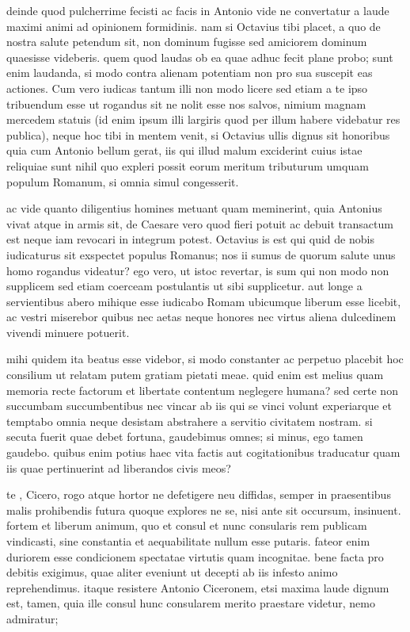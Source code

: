  deinde quod pulcherrime fecisti ac facis in Antonio vide ne convertatur a laude maximi animi ad opinionem formidinis. nam si Octavius tibi placet, a quo de nostra salute petendum sit, non dominum fugisse sed amiciorem dominum quaesisse videberis. quem quod laudas ob ea quae adhuc fecit plane probo; sunt enim laudanda, si modo contra alienam potentiam non pro sua suscepit eas actiones. Cum vero iudicas tantum illi non modo licere sed etiam a te ipso tribuendum esse ut rogandus sit ne nolit esse nos salvos, nimium magnam mercedem statuis (id enim ipsum illi largiris quod per illum habere videbatur res publica), neque hoc tibi in mentem venit, si Octavius ullis dignus sit honoribus quia cum Antonio bellum gerat, iis qui illud malum exciderint cuius istae reliquiae sunt nihil quo expleri possit eorum meritum tributurum umquam populum Romanum, si omnia simul congesserit.

 ac vide quanto diligentius homines metuant quam meminerint, quia Antonius vivat atque in armis sit, de Caesare vero quod fieri potuit ac debuit transactum est neque iam revocari in integrum potest. Octavius is est qui quid de nobis iudicaturus sit exspectet populus Romanus; nos ii sumus de quorum salute unus homo rogandus videatur? ego vero, ut istoc revertar, is sum qui non modo non supplicem sed etiam coerceam postulantis ut sibi supplicetur. aut longe a servientibus abero mihique esse iudicabo Romam ubicumque liberum esse licebit, ac vestri miserebor quibus nec aetas neque honores nec virtus aliena dulcedinem vivendi minuere potuerit.

 mihi quidem ita beatus esse videbor, si modo constanter ac perpetuo placebit hoc consilium ut relatam putem gratiam pietati meae. quid enim est melius quam memoria recte factorum et libertate contentum neglegere humana? sed certe non succumbam succumbentibus nec vincar ab iis qui se vinci volunt experiarque et temptabo omnia neque desistam abstrahere a servitio civitatem nostram. si secuta fuerit quae debet fortuna, gaudebimus omnes; si minus, ego tamen gaudebo. quibus enim potius haec vita factis aut cogitationibus traducatur quam iis quae pertinuerint ad liberandos civis meos?

 te , Cicero, rogo atque hortor ne defetigere neu diffidas, semper in praesentibus malis prohibendis futura quoque explores ne se, nisi ante sit occursum, insinuent. fortem et liberum animum, quo et consul et nunc consularis rem publicam vindicasti, sine constantia et aequabilitate nullum esse putaris. fateor enim duriorem esse condicionem spectatae virtutis quam incognitae. bene facta pro debitis exigimus, quae aliter eveniunt ut decepti ab iis infesto animo reprehendimus. itaque resistere Antonio Ciceronem, etsi maxima laude dignum est, tamen, quia ille consul hunc consularem merito praestare videtur, nemo admiratur;


